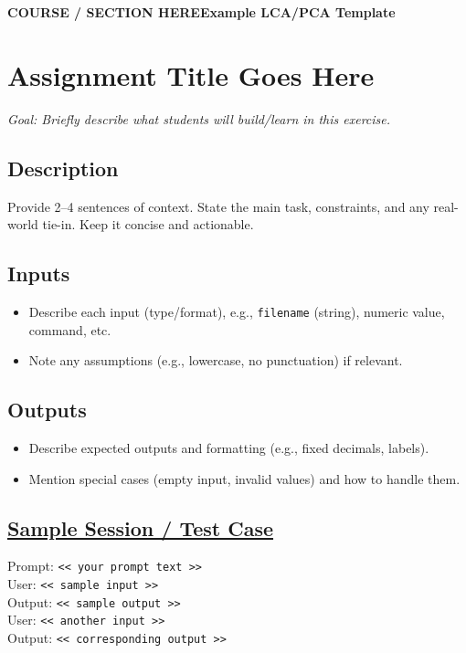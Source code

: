 \documentclass[11pt]{article}
\newenvironment{testcase}{%
  \def\FrameCommand##1{\colorbox{lightorange}{##1}}%
  \MakeFramed{\advance\hsize -1em \FrameRestore}%
}{\endMakeFramed}
\newcommand{\pageheader}{
  \begin{flushleft}\small
  \textbf{COURSE / SECTION HERE}\hfill\textbf{Example LCA/PCA Template}\par
  \hrulefill
  \end{flushleft}
}
\begin{document}
\pagestyle{empty}
\pageheader

\section*{\textcolor{gatororange}{Assignment Title Goes Here}}
\textit{Goal: Briefly describe what students will build/learn in this exercise.}

\subsection*{Description}
Provide 2--4 sentences of context. State the main task, constraints, and any real-world tie-in. Keep it concise and actionable.

\subsection*{Inputs}
\begin{itemize}
  \item Describe each input (type/format), e.g., \texttt{filename} (string), numeric value, command, etc.
  \item Note any assumptions (e.g., lowercase, no punctuation) if relevant.
\end{itemize}

\subsection*{Outputs}
\begin{itemize}
  \item Describe expected outputs and formatting (e.g., fixed decimals, labels).
  \item Mention special cases (empty input, invalid values) and how to handle them.
\end{itemize}

\subsection*{\underline{Sample Session / Test Case}}
\begin{testcase}\small
\textcolor{consoleblue}{Prompt:} \texttt{\textless{}\textless{} your prompt text \textgreater{}\textgreater{}}\\
\textcolor{consoleblue}{User:} \texttt{\textless{}\textless{} sample input \textgreater{}\textgreater{}}\\
\textcolor{consoleblue}{Output:} \texttt{\textless{}\textless{} sample output \textgreater{}\textgreater{}}\\
\textcolor{consoleblue}{User:} \texttt{\textless{}\textless{} another input \textgreater{}\textgreater{}}\\
\textcolor{consoleblue}{Output:} \texttt{\textless{}\textless{} corresponding output \textgreater{}\textgreater{}}
\end{testcase}
\end{document}
